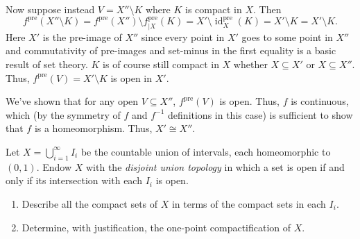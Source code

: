 \documentclass[12 pt, letterpaper]{hmcpset}
\begin{document}
\begin{solution}
\begin{enumerate}
			Now suppose instead $V = X'' \setminus K$ where $K$ is compact in $X$. Then
			 \[
				f^{\text{pre}}(X'' \setminus K) = f^{\text{pre}}(X'') \setminus f_{\mid X}^{\text{pre}}(K) = X' \setminus \operatorname{id}_{X}^{\text{pre}}(K) = X' \setminus K = X' \setminus K.
			\]
			Here $X'$ is the pre-image of $X''$ since every point in $X'$ goes to some point in $X''$ and commutativity of pre-images and set-minus in the first equality is a basic result of set theory. $K$ is of course still compact in $X$ whether $X \subseteq X'$ or $X \subseteq X''$. Thus, $f^{\text{pre}}(V) = X' \setminus K$ is open in $X'$.

			We've shown that for any open $V \subseteq X''$, $f^{\text{pre}}(V)$ is open. Thus, $f$ is continuous, which (by the symmetry of $f$ and $f^{-1}$ definitions in this case) is sufficient to show that $f$ is a homeomorphism. Thus, $X' \cong X''$.
	\end{enumerate}
\end{solution}

\pagebreak

\begin{problem}[Problem 2]
	Let $X = \bigcup_{i = 1}^{\infty} I_{i}$ be the countable union of intervals, each homeomorphic to $(0, 1)$. Endow $X$ with the \emph{disjoint union topology} in which a set is open if and only if its intersection with each $I_{i}$ is open.

	\begin{enumerate}
		\item Describe all the compact sets of $X$ in terms of the compact sets in each $I_{i}$.

		\item Determine, with justification, the one-point compactification of $X$.
	\end{enumerate}
\end{problem}
\end{document}
